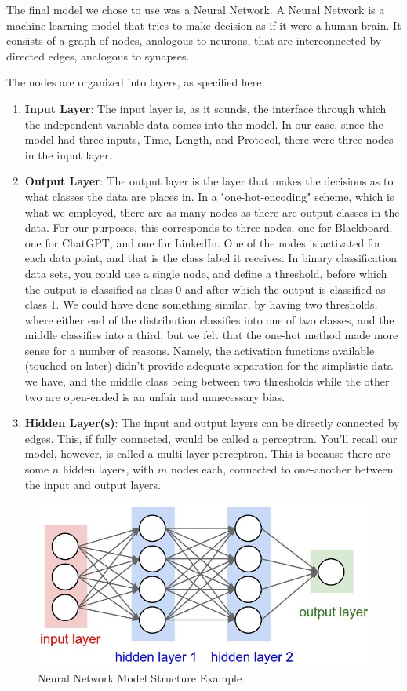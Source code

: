 \documentclass[10pt,sigconf,letterpaper,nonacm]{acmart}
\begin{document}
The final model we chose to use was a Neural Network.
A Neural Network is a machine learning model that tries to make decision as if it were a human brain. 
It consists of a graph of nodes, analogous to neurons, that are interconnected by directed edges, analogous to synapses.

The nodes are organized into layers, as specified here.
\begin{enumerate}
    \item {\bf Input Layer}: The input layer is, as it sounds, the interface through which the independent variable data comes into the model. 
    In our case, since the model had three inputs, Time, Length, and Protocol, there were three nodes in the input layer.
    \item {\bf Output Layer}: The output layer is the layer that makes the decisions as to what classes the data are places in. In a "one-hot-encoding" scheme, which is what we employed, there are as many nodes as there are output classes in the data. For our purposes, this corresponds to three nodes, one for Blackboard, one for ChatGPT, and one for LinkedIn. One of the nodes is activated for each data point, and that is the class label it receives.
    In binary classification data sets, you could use a single node, and define a threshold, before which the output is classified as class 0 and after which the output is classified as class 1.
    We could have done something similar, by having two thresholds, where either end of the distribution classifies into one of two classes, and the middle classifies into a third, but we felt that the one-hot method made more sense for a number of reasons.
    Namely, the activation functions available (touched on later) didn't provide adequate separation for the simplistic data we have, 
    and the middle class being between two thresholds while the other two are open-ended is an unfair and unnecessary bias.
    \item {\bf Hidden Layer(s)}: The input and output layers can be directly connected by edges. 
    This, if fully connected, would be called a perceptron. 
    You'll recall our model, however, is called a multi-layer perceptron. 
    This is because there are some $n$ hidden layers, with $m$ nodes each, connected to one-another between the input and output layers.
\end{enumerate}
\begin{figure}
    \centering
    \includegraphics[width=1\linewidth]{Figures_and_Graphs/nn_example.png}
    \caption{Neural Network Model Structure Example}
    \label{fig:nn}
\end{figure}
\end{document}
